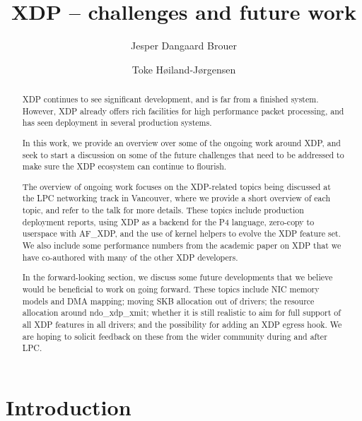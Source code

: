 \documentclass[sigconf]{acmart}
\begin{document}
\title{XDP -- challenges and future work}
\author{Jesper Dangaard Brouer}

\author{Toke Høiland-Jørgensen}


\captionsetup{font+=small}


\begin{abstract}
  XDP continues to see significant development, and is far from a finished
  system. However, XDP already offers rich facilities for high performance
  packet processing, and has seen deployment in several production systems.

  In this work, we provide an overview over some of the ongoing work around XDP,
  and seek to start a discussion on some of the future challenges that need to
  be addressed to make sure the XDP ecosystem can continue to flourish.

  The overview of ongoing work focuses on the XDP-related topics being discussed
  at the LPC networking track in Vancouver, where we provide a short overview of
  each topic, and refer to the talk for more details. These topics include
  production deployment reports, using XDP as a backend for the P4 language,
  zero-copy to userspace with AF\_XDP, and the use of kernel helpers to evolve
  the XDP feature set. We also include some performance numbers from the
  academic paper on XDP that we have co-authored with many of the other XDP
  developers.

  In the forward-looking section, we discuss some future developments that we
  believe would be beneficial to work on going forward. These topics include NIC
  memory models and DMA mapping; moving SKB allocation out of drivers; the
  resource allocation around ndo\_xdp\_xmit; whether it is still realistic to
  aim for full support of all XDP features in all drivers; and the possibility
  for adding an XDP egress hook. We are hoping to solicit feedback on these from
  the wider community during and after LPC.
\end{abstract}


\maketitle

\section{Introduction}%
\label{sec:introduction}
\end{document}
